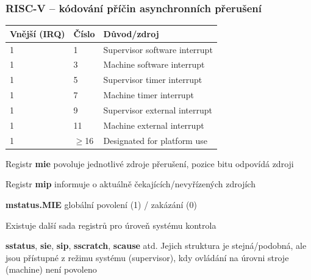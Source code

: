 \documentclass{beamer}
\begin{document}
\begin{frame}
\frametitle{RISC-V -- kódování příčin asynchronních přerušení}

\begin{center}
\small
\begin{tabular}{|l|l|l|}  \hline
Vnější (IRQ) & Číslo & Důvod/zdroj \\\hline
1 & 1 & Supervisor software interrupt \\\hline
1 & 3 & Machine software interrupt \\\hline
1 & 5 & Supervisor timer interrupt \\\hline
1 & 7 & Machine timer interrupt \\\hline
1 & 9 & Supervisor external interrupt \\\hline
1 & 11 & Machine external interrupt \\\hline
1 & $\ge$16  & Designated for platform use \\\hline
\end{tabular}
\end{center}

\small
Registr \textbf{mie} povoluje jednotlivé zdroje přerušení, pozice bitu odpovídá
zdroji

Registr \textbf{mip} informuje o aktuálně čekajících/nevyřízených zdrojích

\textbf{mstatus.MIE} globální povolení (1) / zakázání (0)

Existuje další sada registrů pro úroveň systému
kontrola

\textbf{sstatus}, \textbf{sie}, \textbf{sip}, \textbf{sscratch}, \textbf{scause} atd. Jejich struktura je
stejná/podobná, ale jsou přístupné z režimu systému (supervisor), kdy ovládání na úrovni stroje (machine) není povoleno
\end{frame}
\end{document}
